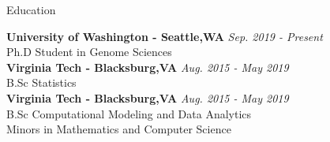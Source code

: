 \documentclass{resume} %
\begin{document}

\begin{rSection}{Education}

{\bf University of Washington - Seattle,WA} \hfill {\em Sep. 2019 - Present}
\\ Ph.D Student in Genome Sciences \smallskip \\
{\bf Virginia Tech - Blacksburg,VA} \hfill {\em Aug. 2015 - May 2019}
\\ B.Sc Statistics  \smallskip
\\{\bf Virginia Tech - Blacksburg,VA} \hfill {\em Aug. 2015 - May 2019}
\\ B.Sc Computational Modeling and Data Analytics \smallskip  \\
Minors in Mathematics and Computer Science
\end{rSection}



\end{document}
